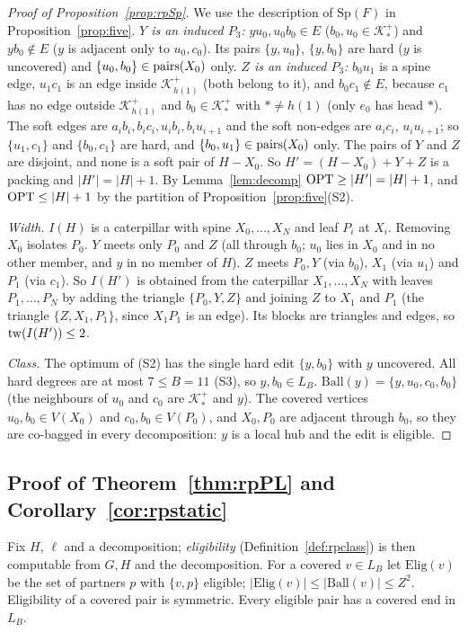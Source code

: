 \begin{proof}[Proof of Proposition~\ref{prop:rpSp}]
We use the description of $\mathrm{Sp}(F)$ in Proposition~\ref{prop:five}. \emph{$Y$ is an induced $P_3$:} $yu_0,u_0b_0\in E$ ($b_0,u_0\in\mathcal K_*^+$) and $yb_0\notin E$ ($y$ is adjacent only to $u_0,c_0$). Its pairs $\{y,u_0\}$, $\{y,b_0\}$ are hard ($y$ is uncovered) and $\{u_0,b_0\}\in\mathrm{pairs}(X_0)$ only. \emph{$Z$ is an induced $P_3$:} $b_0u_1$ is a spine edge, $u_1c_1$ is an edge inside $\mathcal K^+_{h(1)}$ (both belong to it), and $b_0c_1\notin E$, because $c_1$ has no edge outside $\mathcal K^+_{h(1)}$ and $b_0\in\mathcal K^+_*$ with $*\ne h(1)$ (only $e_0$ has head $*$). The soft edges are $a_ib_i,b_ic_i,u_ib_i,b_iu_{i+1}$ and the soft non-edges are $a_ic_i$, $u_iu_{i+1}$; so $\{u_1,c_1\}$ and $\{b_0,c_1\}$ are hard, and $\{b_0,u_1\}\in\mathrm{pairs}(X_0)$ only. The pairs of $Y$ and $Z$ are disjoint, and none is a soft pair of $H-X_0$. So $H'=(H-X_0)+Y+Z$ is a packing and $|H'|=|H|+1$. By Lemma~\ref{lem:decomp} $\mathrm{OPT}\ge|H'|=|H|+1$, and $\mathrm{OPT}\le|H|+1$ by the partition of Proposition~\ref{prop:five}(S2).

\emph{Width.} $I(H)$ is a caterpillar with spine $X_0,\dots,X_N$ and leaf $P_i$ at $X_i$. Removing $X_0$ isolates $P_0$. $Y$ meets only $P_0$ and $Z$ (all through $b_0$; $u_0$ lies in $X_0$ and in no other member, and $y$ in no member of $H$). $Z$ meets $P_0,Y$ (via $b_0$), $X_1$ (via $u_1$) and $P_1$ (via $c_1$). So $I(H')$ is obtained from the caterpillar $X_1,\dots,X_N$ with leaves $P_1,\dots,P_N$ by adding the triangle $\{P_0,Y,Z\}$ and joining $Z$ to $X_1$ and $P_1$ (the triangle $\{Z,X_1,P_1\}$, since $X_1P_1$ is an edge). Its blocks are triangles and edges, so $\mathrm{tw}(I(H'))\le2$.

\emph{Class.} The optimum of (S2) has the single hard edit $\{y,b_0\}$ with $y$ uncovered. All hard degrees are at most $7\le B=11$ (S3), so $y,b_0\in L_B$. $\mathrm{Ball}(y)=\{y,u_0,c_0,b_0\}$ (the neighbours of $u_0$ and $c_0$ are $\mathcal K_*^+$ and $y$). The covered vertices $u_0,b_0\in V(X_0)$ and $c_0,b_0\in V(P_0)$, and $X_0,P_0$ are adjacent through $b_0$, so they are co-bagged in every decomposition: $y$ is a local hub and the edit is eligible.
\end{proof}

\subsection{Proof of Theorem~\ref{thm:rpPL} and Corollary~\ref{cor:rpstatic}}
Fix $H$, $\ell$ and a decomposition; \emph{eligibility} (Definition~\ref{def:rpclass}) is then computable from $G,H$ and the decomposition. For a covered $v\in L_B$ let $\mathrm{Elig}(v)$ be the set of partners $p$ with $\{v,p\}$ eligible; $|\mathrm{Elig}(v)|\le|\mathrm{Ball}(v)|\le Z^2$. Eligibility of a covered pair is symmetric. Every eligible pair has a covered end in $L_B$.

